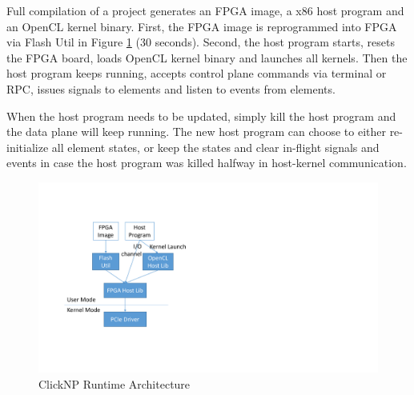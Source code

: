 {Full compilation of a project generates an FPGA image, a x86 host program and an OpenCL kernel binary. First, the FPGA image is reprogrammed into FPGA via Flash Util in Figure \ref{clicknp:fig:CatapultFPGAArch} (30 seconds). Second, the host program starts, resets the FPGA board, loads OpenCL kernel binary and launches all kernels. Then the host program keeps running, accepts control plane commands via terminal or RPC, issues signals to elements and listen to events from elements.

When the host program needs to be updated, simply kill the host program and the data plane will keep running. The new host program can choose to either re-initialize all element states, or keep the states and clear in-flight signals and events in case the host program was killed halfway in host-kernel communication.

\begin{figure}[!t]
	\centering
	\includegraphics[width=0.8\columnwidth]{image/CatapultRuntime}
	\vspace{-0.15in}
	\caption{ClickNP Runtime Architecture}
	\vspace{-0.15in}
	\label{clicknp:fig:CatapultFPGAArch}
\end{figure}
}

